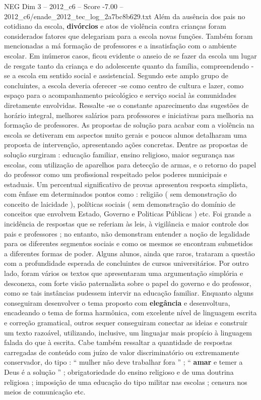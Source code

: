 \begin{textsample}{NEG Dim 3 – 2012\_c6 – Score -7.00 – 2012\_c6/enade\_2012\_tec\_log\_2a7bc8b629.txt}
Além da ausência dos pais no cotidiano da escola, \textbf{divórcios} e atos de violência contra crianças foram considerados fatores que delegariam para a escola novas funções.
Também foram mencionadas a má formação de professores e a insatisfação com o ambiente escolar.
Em inúmeros casos, ficou evidente o anseio de se fazer da escola um lugar de resgate tanto da criança e do adolescente quanto da família, compreendendo -se a escola em sentido social e assistencial.
Segundo este amplo grupo de concluintes, a escola deveria oferecer -se como centro de cultura e lazer, como espaço para o acompanhamento psicológico e serviço social às comunidades diretamente envolvidas.
Ressalte -se o constante aparecimento das sugestões de horário integral, melhores salários para professores e iniciativas para melhoria na formação de professores.
As propostas de solução para acabar com a violência na escola se detiveram em aspectos muito gerais e poucos alunos detalharam uma proposta de intervenção, apresentando ações concretas.
Dentre as propostas de solução surgiram : educação familiar, ensino religioso, maior segurança nas escolas, com utilização de aparelhos para detecção de armas, e o retorno do papel do professor como um profissional respeitado pelos poderes municipais e estaduais.
Um percentual significativo de provas apresentou resposta simplista, com ênfase em determinados pontos como : religião ( sem demonstração do conceito de laicidade ), políticas sociais ( sem demonstração do domínio de conceitos que envolvem Estado, Governo e Politicas Públicas ) etc.
Foi grande a incidência de respostas que se referiam às leis, à vigilância e maior controle dos pais e professores ; no entanto, não demonstram entender a noção de legalidade para os diferentes segmentos sociais e como os mesmos se encontram submetidos a diferentes formas de poder.
Alguns alunos, ainda que raros, trataram a questão com a profundidade esperada de concluintes de cursos universitários.
Por outro lado, foram vários os textos que apresentaram uma argumentação simplória e desconexa, com forte visão paternalista sobre o papel do governo e do professor, como se tais instâncias pudessem intervir na educação familiar.
Enquanto alguns conseguiram desenvolver o tema proposto com \textbf{elegância} e desenvoltura, encadeando o tema de forma harmônica, com excelente nível de linguagem escrita e correção gramatical, outros sequer conseguiram conectar as ideias e construir um texto razoável, utilizando, inclusive, um linguajar mais propício à linguagem falada do que à escrita.
Cabe também ressaltar a quantidade de respostas carregadas de conteúdo com juízo de valor discriminatório ou extremamente conservador, do tipo : “ mulher não deve trabalhar fora ” ; “ \textbf{amar} e temer a Deus é a solução ” ; obrigatoriedade do ensino religioso e de uma doutrina religiosa ; imposição de uma educação do tipo militar nas escolas ; censura nos meios de comunicação etc.

\end{textsample}
